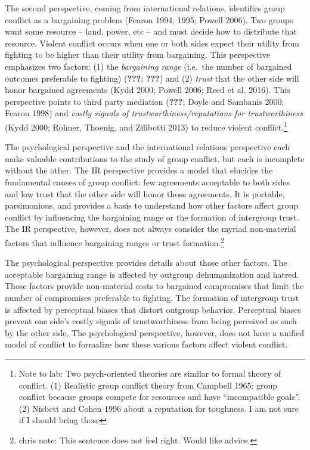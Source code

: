 \documentclass[11pt]{article}
\begin{document}
The second perspective, coming from international relations, identifies
group conflict as a bargaining problem (Fearon 1994, 1995; Powell 2006).
Two groups want some resource -- land, power, etc -- and must decide how
to distribute that resource. Violent conflict occurs when one or both
sides expect their utility from fighting to be higher than their utility
from bargaining. This perspective emphasizes two factors: (1) the
\emph{bargaining range} (i.e.~the number of bargained outcomes
preferable to fighting) ({\textbf{???}}; {\textbf{???}}) and (2)
\emph{trust} that the other side will honor bargained agreements (Kydd
2000; Powell 2006; Reed et al. 2016). This perspective points to third
party mediation ({\textbf{???}}; Doyle and Sambanis 2000; Fearon 1998)
and \emph{costly signals of trustworthiness/reputations for
trustworthiness} (Kydd 2000; Rohner, Thoenig, and Zilibotti 2013) to
reduce violent conflict.\footnote{Note to lab: Two psych-oriented
  theories are similar to formal theory of conflict. (1) Realistic group
  conflict theory from Campbell 1965: group conflict because groups
  compete for resources and have ``incompatible goals''. (2) Nisbett and
  Cohen 1996 about a reputation for toughness. I am not sure if I should
  bring those }

The psychological perspective and the international relations
perspective each make valuable contributions to the study of group
conflict, but each is incomplete without the other. The IR perspective
provides a model that elucides the fundamental causes of group conflict:
few agreements acceptable to both sides and low trust that the other
side will honor those agreements. It is portable, parsimonious, and
provides a basis to understand how other factors affect group conflict
by influencing the bargaining range or the formation of intergroup
trust. The IR perspective, however, does not always consider the myriad
non-material factors that influence bargaining ranges or trust
formation.\footnote{chris note: This sentence does not feel right. Would
  like advice.}

The psychological perspective provides details about those other
factors. The acceptable bargaining range is affected by outgroup
dehumanization and hatred. Those factors provide non-material costs to
bargained compromises that limit the number of compromises preferable to
fighting. The formation of intergroup trust is affected by perceptual
biases that distort outgroup behavior. Perceptual biases prevent one
side's costly signals of trustworthiness from being perceived as such by
the other side. The psychological perspective, however, does not have a
unified model of conflict to formalize how these various factors affect
violent conflict.
\end{document}
